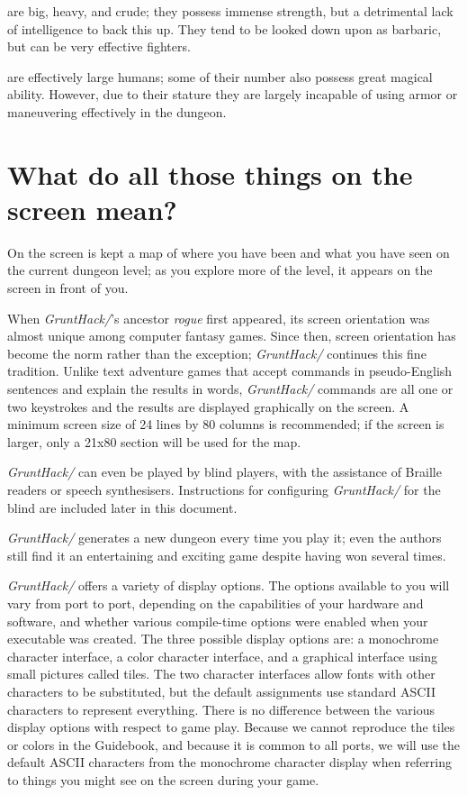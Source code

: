 %
\item[\bb{Ogres}]%
are big, heavy, and crude; they possess immense strength, but
a detrimental lack of intelligence to back this up.  They tend to be looked
down upon as barbaric, but can be very effective fighters.

%
\item[\bb{Giants}]%
are effectively large humans; some of their number also
possess great magical ability.  However, due to their stature they are largely
incapable of using armor or maneuvering effectively in the dungeon.
\elist
\section{What do all those things on the screen mean?}

On the screen is kept a map of where you have
been and what you have seen on the current dungeon level; as you
explore more of the level, it appears on the screen in front of you.

When {\it GruntHack/}'s ancestor %
{\it rogue}
first appeared, its screen
orientation was almost unique among computer fantasy games.  Since
then, screen orientation has become the norm rather than the
exception; {\it GruntHack/} continues this fine tradition.  Unlike text
adventure games that accept commands in pseudo-English sentences and
explain the results in words, {\it GruntHack/} commands are all one or two
keystrokes and the results are displayed graphically on the screen.  A
minimum screen size of 24 lines by 80 columns is recommended; if the
screen is larger, only a 21x80 section will be used for the map.

{\it GruntHack/} can even be played by blind players, with the assistance of Braille
readers or speech synthesisers.  Instructions for configuring {\it GruntHack/} for
the blind are included later in this document.

{\it GruntHack/} generates a new dungeon every time you play it; even the
authors still find it an entertaining and exciting game despite
having won several times.

{\it GruntHack/} offers a variety of display options.  The options available to you
will vary from port to port, depending on the capabilities of your
hardware and software, and whether various compile-time options were
enabled when your executable was created.  The three possible display
options are: a monochrome character interface, a color character interface,
and a graphical interface using small pictures called tiles.  The two
character interfaces allow fonts with other characters to be substituted,
but the default assignments use standard ASCII characters to represent
everything.  There is no difference between the various display options
with respect to game play.  Because we cannot reproduce the tiles or
colors in the Guidebook, and because it is common to all ports, we will
use the default ASCII characters from the monochrome character display
when referring to things you might see on the screen during your game.

